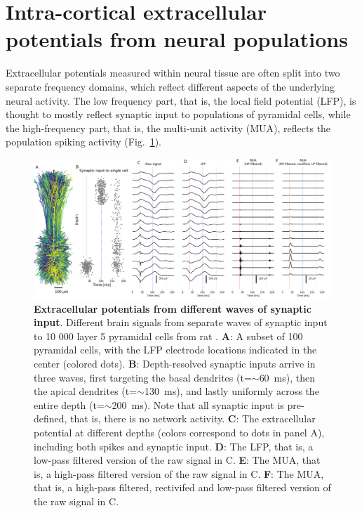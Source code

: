 \documentclass[preprint,11pt,authoryear]{elsarticle}
\begin{document}
\section{Intra-cortical extracellular potentials from neural populations}
Extracellular potentials measured within neural tissue are often split into two separate frequency domains, which reflect different aspects of the underlying neural activity. 
The low frequency part, that is, the local field potential (LFP), is thought to mostly reflect synaptic input to populations of pyramidal cells, while the high-frequency part, that is, the multi-unit activity (MUA), reflects the population spiking activity (Fig.~\ref{fig:LFP_MUA}).

\begin{figure}[!ht]
\begin{center}
\includegraphics[width=1\textwidth]{population_LFP_MUA.png}
\end{center}
\caption{\textbf{Extracellular potentials from different waves of synaptic input}. Different brain signals from separate waves of synaptic input to 10 000 layer 5 pyramidal cells from rat \citep{Hay2011}.
{\bf A}: A subset of 100 pyramidal cells, with the LFP electrode locations indicated in the center (colored dots).
{\bf B}: Depth-resolved synaptic inputs arrive in three waves, first targeting the basal dendrites (t=$\sim$60~ms), then the apical dendrites (t=$\sim$130~ms), and lastly uniformly across the entire depth (t=$\sim$200~ms). Note that all synaptic input is pre-defined, that is, there is no network activity.
{\bf C}: The extracellular potential at different depths (colors correspond to dots in panel A), including both spikes and synaptic input.
{\bf D}: The LFP, that is, a low-pass filtered version of the raw signal in C.
{\bf E}: The MUA, that is, a high-pass filtered version of the raw signal in C.
{\bf F}: The MUA, that is, a high-pass filtered, rectivifed and low-pass filtered version of the raw signal in C.
}
\label{fig:LFP_MUA}
\end{figure}
\end{document}
